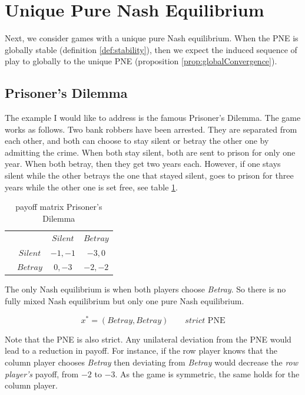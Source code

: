 \section{Unique Pure Nash Equilibrium}\label{section:uniquePureNashEquilibrium}

Next, we consider games with a unique pure Nash equilibrium. When the PNE is globally stable (definition \ref{def:stability}), then we expect the induced sequence of play to globally to the unique PNE (proposition \ref{prop:globalConvergence}). 

\subsection{Prisoner's Dilemma}\label{subsection:prisonersDilemma}

The example I would like to address is the famous Prisoner's Dilemma. The game works as follows. Two bank robbers have been arrested. They are separated from each other, and both can choose to stay silent or betray the other one by admitting the crime. When both stay silent, both are sent to prison for only one year. When both betray, then they get two years each. However, if one stays silent while the other betrays the one that stayed silent, goes to prison for three years while the other one is set free, see table \ref{tab:payoffPrisoners}.

\begin{table}[H]\centering
\setlength{\extrarowheight}{2pt}
\begin{tabular}{cc|c|c|}
  & \multicolumn{1}{c}{} & \multicolumn{1}{c}{$Silent$}  & \multicolumn{1}{c}{$Betray$} \\\cline{3-4}
  & $Silent$ & $-1,-1$ & $-3,0$ \\\cline{3-4}
  & $Betray$ & $0,-3$ & $-2,-2$ \\\cline{3-4}
\end{tabular}\caption{\label{tab:payoffPrisoners}payoff matrix Prisoner's Dilemma}
\end{table}

The only Nash equilibrium is when both players choose \textit{Betray}. So there is no fully mixed Nash equilibrium but only one pure Nash equilibrium. 

\begin{equation*}
    x^{*} = (Betray,Betray) \qquad \textit{strict }\text{PNE}
\end{equation*}

Note that the PNE is also strict. Any unilateral deviation from the PNE would lead to a reduction in payoff. For instance, if the row player knows that the column player  chooses \textit{Betray} then deviating from \textit{Betray} would decrease the \textit{row player's} payoff, from $-2$ to $-3$. As the game is symmetric, the same holds for the column player. \\


